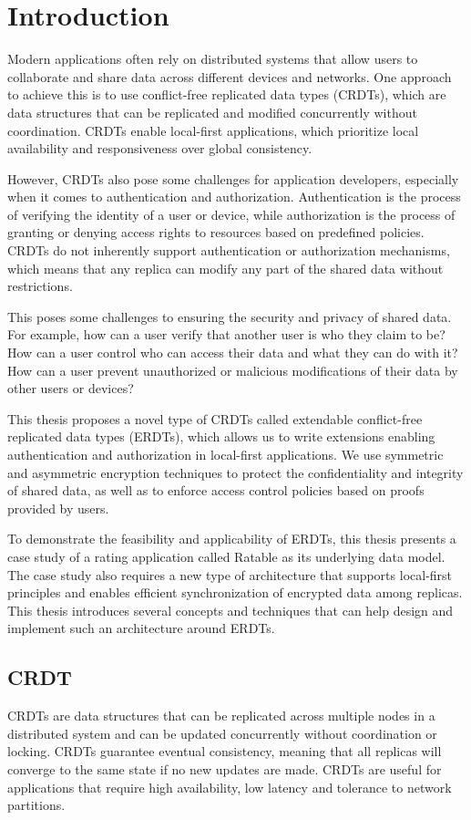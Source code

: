 \documentclass[
	english,
	ruledheaders=section,   %
	class=report,		    %
	thesis={type=bachelor}, %
	accentcolor=9c,			%
	custommargins=true,    %
	marginpar=false,        %
	parskip=half-,          %
	fontsize=11pt,          %
]{tudapub}
\begin{document}
\tableofcontents

\chapter{Introduction}
Modern applications often rely on distributed systems that allow users to collaborate and share data across different devices and networks. One approach to achieve this is to use conflict-free replicated data types (CRDTs), which are data structures that can be replicated and modified concurrently without coordination. CRDTs enable local-first applications, which prioritize local availability and responsiveness over global consistency.

However, CRDTs also pose some challenges for application developers, especially when it comes to authentication and authorization. Authentication is the process of verifying the identity of a user or device, while authorization is the process of granting or denying access rights to resources based on predefined policies. CRDTs do not inherently support authentication or authorization mechanisms, which means that any replica can modify any part of the shared data without restrictions.

This poses some challenges to ensuring the security and privacy of shared data. For example, how can a user verify that another user is who they claim to be? How can a user control who can access their data and what they can do with it? How can a user prevent unauthorized or malicious modifications of their data by other users or devices?

This thesis proposes a novel type of CRDTs called extendable conflict-free replicated data types (ERDTs), which allows us to write extensions enabling authentication and authorization in local-first applications. We use symmetric and asymmetric encryption techniques to protect the confidentiality and integrity of shared data, as well as to enforce access control policies based on proofs provided by users. 

To demonstrate the feasibility and applicability of ERDTs, this thesis presents a case study of a rating application called Ratable as its underlying data model. The case study also requires a new type of architecture that supports local-first principles and enables efficient synchronization of encrypted data among replicas. This thesis introduces several concepts and techniques that can help design and implement such an architecture around ERDTs.

\section{CRDT}
CRDTs are data structures that can be replicated across multiple nodes in a distributed system and can be updated concurrently without coordination or locking. CRDTs guarantee eventual consistency, meaning that all replicas will converge to the same state if no new updates are made. CRDTs are useful for applications that require high availability, low latency and tolerance to network partitions.
\end{document}
